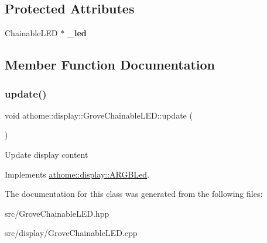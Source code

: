 \subsection*{Protected Attributes}
\begin{DoxyCompactItemize}
\item 
\mbox{\label{classathome_1_1display_1_1_grove_chainable_l_e_d_a4376da3d5ad9f1763aa6b3b45ec7e01a}} 
Chainable\+L\+ED $\ast$ {\bfseries \+\_\+led}
\end{DoxyCompactItemize}


\subsection{Member Function Documentation}
\mbox{\label{classathome_1_1display_1_1_grove_chainable_l_e_d_a05a4a1381396b7fc11a24993865d8226}} 
\subsubsection{\texorpdfstring{update()}{update()}}
{\footnotesize\ttfamily void athome\+::display\+::\+Grove\+Chainable\+L\+E\+D\+::update (\begin{DoxyParamCaption}{ }\end{DoxyParamCaption})\hspace{0.3cm}{\ttfamily [virtual]}}

Update display content 

Implements \mbox{\hyperlink{classathome_1_1display_1_1_a_r_g_b_led_a725ceca0c01735daa9c95148baf075ab}{athome\+::display\+::\+A\+R\+G\+B\+Led}}.



The documentation for this class was generated from the following files\+:\begin{DoxyCompactItemize}
\item 
src/Grove\+Chainable\+L\+E\+D.\+hpp\item 
src/display/Grove\+Chainable\+L\+E\+D.\+cpp\end{DoxyCompactItemize}
